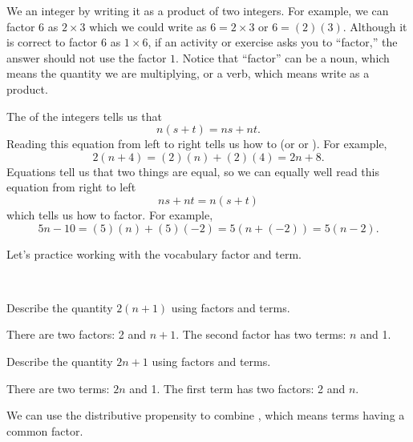 \begin{defn} 
\begin{apart}
       \item We  an integer by writing it as a product of two integers.  For example, we can factor $6$ as $2 \times 3$ which we could write as $6=2 \times 3$ or $6=(2)(3)$.  Although it is correct to factor $6$ as $1 \times 6$, if an activity or exercise asks you to ``factor,'' the answer should not use the factor $1$. Notice that ``factor'' can be a noun, which means the quantity we are multiplying, or a verb, which means write as a product.
       
       \item The  of the integers tells us that 
           $$n(s+t)=ns+nt.$$ 
       Reading this equation from left to right tells us how to  (or  or ). For example, 
           $$2(n+4) = (2)(n) + (2)(4) = 2n + 8.$$ 
       Equations tell us that two things are equal, so we can equally well read this equation from right to left $$ns+nt=n(s+t)$$ which tells us how to factor.  For example, 
           $$5n-10 = (5)(n) + (5)(-2) = 5(n+(-2)) = 5(n-2).$$
    \end{apart}
\end{defn}

Let's practice working with the vocabulary factor and term.

\begin{exam}
\label{exam_factors_terms}
~
    \begin{apart}
        \item Describe the quantity $2(n+1)$ using factors and terms.
            \begin{soln}
                There are two factors: 2 and $n+1$.  The second factor has two terms: $n$ and 1.
            \end{soln}
        \item Describe the quantity $2n+1$ using factors and terms.
            \begin{soln}
                There are two terms: $2n$ and 1.  The first term has two factors: 2 and $n$.
            \end{soln}
    \end{apart}
\end{exam}

We can use the distributive propensity to combine , which means terms having a common factor.

